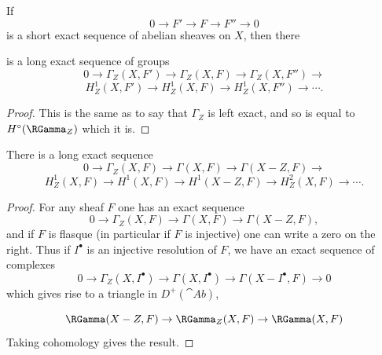 \begin{motif}
If 
\[0 \to F' \to F \to F'' \to 0\]
is a short exact sequence of abelian sheaves on \(X\), then there

\setcounter{page}{217}
is a long exact sequence of groups 
\[0 \to \Gamma_{Z}\left(X, F'\right) \to \Gamma_{Z}(X, F) \to \Gamma_{Z}(X, F'') \to\]
\[H_{Z}^{1}\left(X, F'\right) \to H_{Z}^{1}(X, F) \to H_{Z}^{1}\left(X, F''\right) \to \cdots .\]
\end{motif}
\begin{proof}
This is the same as to say that \(\Gamma_{Z}\) is left exact, and so is equal to \(H^{\circ}(\RGamma_{Z})\) which it is.
\end{proof}

\begin{motif}
There is a long exact sequence 
\[0 \to \Gamma_{Z}(X, F) \to \Gamma(X, F) \to \Gamma(X-Z, F) \to\]
\[H_{Z}^{1}(X, F) \to H^{1}(X, F) \to H^{1}(X-Z, F) \to H_{Z}^{2}(X, F) \to \cdots .\]
\end{motif}
\begin{proof}
For any sheaf \(F\) one has an exact sequence
\[0 \to \Gamma_{Z}(X, F) \to \Gamma(X, F) \to \Gamma(X-Z, F),\]
and if \(F\) is flasque (in particular if \(F\) is injective) one can write a zero on the right. Thus if \(I^\bullet\) is an injective resolution of \(F\), we have an exact sequence of complexes 
\[0 \to \Gamma_{Z}\left(X, I^{\bullet}\right) \to \Gamma\left(X, I^{\bullet}\right) \to \Gamma\left(X-I^{\bullet}, F\right) \to 0\]
which gives rise to a triangle in \(D^+(\cat{Ab})\),

\setcounter{page}{218}
\[\RGamma(X-Z,F) \to \RGamma_Z(X,F) \to \RGamma(X,F)\]
Taking cohomology gives the result.
\end{proof}

